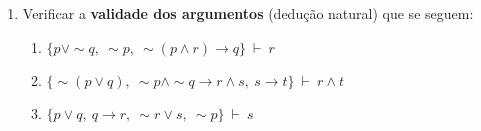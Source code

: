 \documentclass[12pt, a4paper,final]{article}
\begin{document}
\begin{enumerate}

\itemsep 1cm

\item Verificar a \textbf{validade dos argumentos} (dedu\c c\~ao natural) que se seguem: %

\begin{enumerate}

\item $\{ p \vee \sim q,~ \sim p,~ \sim (p \wedge r) \rightarrow q \} ~\vdash~ r$

\item $\{ \sim (p \vee q),~ \sim p \wedge \sim q \rightarrow r \wedge s,~ s \rightarrow t \} ~\vdash~ r \wedge t$

\item $\{ p \vee q,~ q \rightarrow r,~ \sim r \vee s,~ \sim p \} ~\vdash~ s$















\end{enumerate}
\end{enumerate}
\end{document}
